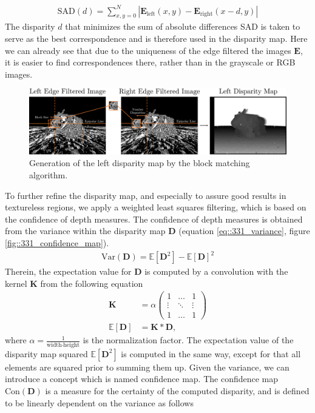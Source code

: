 \begin{align}
	\text{SAD}(d) = \sum_{x,y=0}^N |\bm{E}_\text{left}(x,y) - \bm{E}_\text{right}(x-d,y)|
	\label{eq::331_sad}
\end{align}
The disparity $d$ that minimizes the sum of absolute differences SAD is taken to serve as the best correspondence and is therefore used in the disparity map.  Here we can already see that due to the uniqueness of the edge filtered the images $\bm{E}$, it is easier to find correspondences there, rather than in the grayscale or RGB images.
\begin{figure}[h!]
	\centering
	\includegraphics[scale=.28]{chapters/03_principles_of_machine_learning/img/left_disparity_map.png}
	\caption{Generation of the left disparity map by the block matching algorithm.}
	\label{fig::331_left_disparity_map}
\end{figure}
To further refine the disparity map, and especially to assure good results in textureless  regions, we apply a weighted least squares filtering, which is based on the confidence of depth measures. The confidence of depth measures is obtained from the variance within the disparity map $\bm{D}$ (equation \ref{eq::331_variance}, figure \ref{fig::331_confidence_map}).
\begin{align}
	 \text{Var}(\bm{D}) = \mathbb{E}\left[\bm{D}^2\right] - \mathbb{E}\left[\bm{D}\right]^2
	\label{eq::331_variance}
\end{align} 
Therein, the expectation value for $\bm{D}$ is computed by a convolution with the kernel $\bm{K}$ from the following equation
\begin{align}
	\bm{K} &= \alpha
	\begin{pmatrix}
	1 & \dots & 1 \\
	\vdots & \ddots & \vdots \\
	1 & \dots & 1
	\end{pmatrix} \\
	\mathbb{E}\left[\bm{D}\right] &= \bm{K}*\bm{D},
	\label{eq::331_kernel}
\end{align}
where $\alpha = \frac{1}{\text{width}\cdot\text{height}}$ is the normalization factor. The expectation value of the disparity map squared $\mathbb{E}\left[\bm{D}^2\right]$ is computed in the same way, except for that all elements are squared prior to summing them up. Given the variance, we can introduce a concept which is named confidence map. The confidence map $\text{Con}(\bm{D})$ is a measure for the certainty of the computed disparity, and is defined to be linearly dependent on the variance as follows
